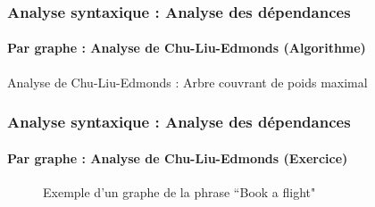 \documentclass[xcolor=table]{beamer}
\begin{document}
\begin{frame}
\frametitle{Analyse syntaxique : Analyse des dépendances}
\framesubtitle{Par graphe : Analyse de Chu-Liu-Edmonds (Algorithme)}

\vspace{-3pt}
\begin{block}{Analyse de Chu-Liu-Edmonds : Arbre couvrant de poids maximal}
	\scriptsize\vspace{-6pt}
	\begin{algorithm}[H]
		
		
		\vspace{-3pt}
	\end{algorithm}\vspace{-3pt}
\end{block}

\end{frame}

\begin{frame}
\frametitle{Analyse syntaxique : Analyse des dépendances}
\framesubtitle{Par graphe : Analyse de Chu-Liu-Edmonds (Exercice)}

\begin{figure}
	\centering
	\caption{Exemple d'un graphe de la phrase ``Book a flight" \cite{2019-jurafsky-martin}}
\end{figure}

\end{frame}


\end{document}
